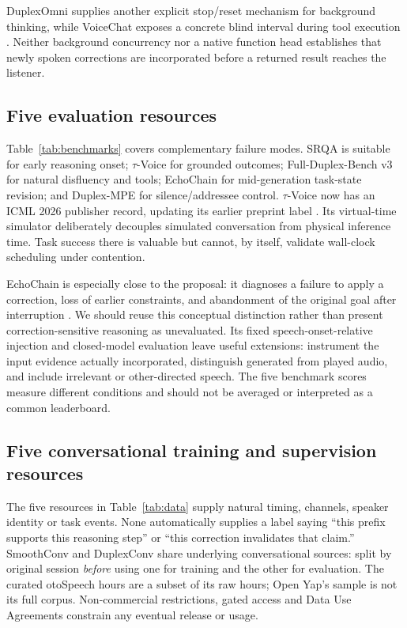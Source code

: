 \documentclass{article}
\begin{document}
DuplexOmni supplies another explicit stop/reset mechanism for background thinking, while VoiceChat exposes a concrete blind interval during tool execution \citep{duplexomni,voicechat}. Neither background concurrency nor a native function head establishes that newly spoken corrections are incorporated before a returned result reaches the listener.

\subsection{Five evaluation resources}

Table~\ref{tab:benchmarks} covers complementary failure modes. SRQA is suitable for early reasoning onset; $\tau$-Voice for grounded outcomes; Full-Duplex-Bench v3 for natural disfluency and tools; EchoChain for mid-generation task-state revision; and Duplex-MPE for silence/addressee control. $\tau$-Voice now has an ICML 2026 publisher record, updating its earlier preprint label \citep{tauvoice}. Its virtual-time simulator deliberately decouples simulated conversation from physical inference time. Task success there is valuable but cannot, by itself, validate wall-clock scheduling under contention.

EchoChain is especially close to the proposal: it diagnoses a failure to apply a correction, loss of earlier constraints, and abandonment of the original goal after interruption \citep{echochain}. We should reuse this conceptual distinction rather than present correction-sensitive reasoning as unevaluated. Its fixed speech-onset-relative injection and closed-model evaluation leave useful extensions: instrument the input evidence actually incorporated, distinguish generated from played audio, and include irrelevant or other-directed speech. The five benchmark scores measure different conditions and should not be averaged or interpreted as a common leaderboard.

\subsection{Five conversational training and supervision resources}

The five resources in Table~\ref{tab:data} supply natural timing, channels, speaker identity or task events. None automatically supplies a label saying ``this prefix supports this reasoning step'' or ``this correction invalidates that claim.'' SmoothConv and DuplexConv share underlying conversational sources: split by original session \emph{before} using one for training and the other for evaluation. The curated otoSpeech hours are a subset of its raw hours; Open Yap's sample is not its full corpus. Non-commercial restrictions, gated access and Data Use Agreements constrain any eventual release or usage.
\end{document}
